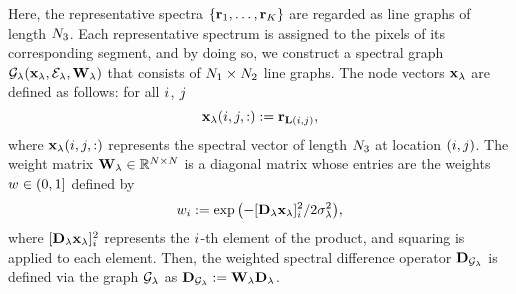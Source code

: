 Here, the representative spectra $\{ \mathbf{r}_{1}, \ldots, \mathbf{r}_{K} \}$ are regarded as line graphs of length $N_{3}$.
Each representative spectrum is assigned to the pixels of its corresponding segment, and by doing so, we construct a spectral graph $\mathcal{G}_{\lambda}(\mathbf{x}_{\lambda}, \mathcal{E}_{\lambda}, \mathbf{W}_{\lambda})$ that consists of $N_{1} \times N_{2}$ line graphs.
The node vectors $\mathbf{x}_{\lambda}$ are defined as follows: for all $i$, $j$
\begin{equation}
    \label{eq:SpectralGraphNode}
    \mathbf{x}_{\lambda}(i, j, :) := \mathbf{r}_{\mathbf{L}(i, j)},
\end{equation}
where $\mathbf{x}_{\lambda}(i, j, :)$ represents the spectral vector of length $N_{3}$ at location $(i, j)$.
The weight matrix $\mathbf{W}_{\lambda} \in \mathbb{R}^{N \times N}$ is a diagonal matrix whose entries are the weights $w_{} \in (0, 1]$ defined by
\begin{equation}
    \label{eq:SpectralGraphWeight}
    w_{i} := \exp{\left( -[\mathbf{D}_{\lambda}\mathbf{x}_{\lambda}]_{i}^{2} / 2\sigma_{\lambda}^{2}\right)},
\end{equation}
where $[\mathbf{D}_{\lambda} \mathbf{x}_{\lambda}]_{i}^{2}$ represents the $i$-th element of the product, and squaring is applied to each element.
Then, the weighted spectral difference operator $\mathbf{D}_{\mathcal{G}_{\lambda}}$ is defined via the graph $\mathcal{G}_{\lambda}$ as $\mathbf{D}_{\mathcal{G}_{\lambda}} := \mathbf{W}_{\lambda} \mathbf{D}_{\lambda}$.



